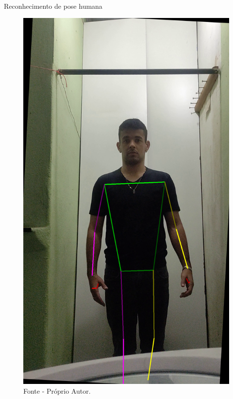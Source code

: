 \begin{frame}{Reconhecimento de pose humana }
    \begin{figure}[!ht]
    \centering
    \includegraphics[scale=0.1]{img/desenvolvimento/eph/landmark.png}
    \caption*{Fonte - Próprio Autor.}
    \end{figure}
\end{frame}



